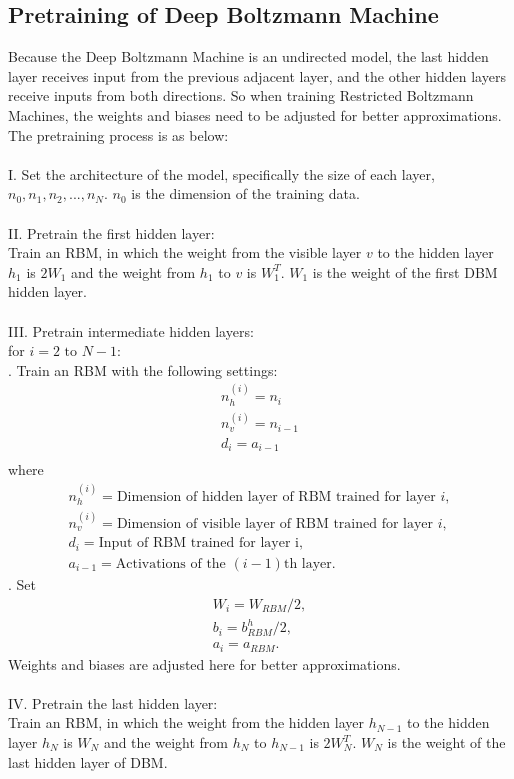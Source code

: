 \documentclass[12pt]{article}
\begin{document}
\subsection{Pretraining of Deep Boltzmann Machine}
Because the Deep Boltzmann Machine is an undirected model, the last hidden layer receives input from the previous adjacent layer, and the other hidden layers receive inputs from both directions. So when training Restricted Boltzmann Machines, the weights and biases need to be adjusted for better approximations. The pretraining process is as below:\\
\\
I. Set the architecture of the model, specifically the size of each layer, \(n_0, n_1, n_2, ..., n_N\). $n_0$ is the dimension of the training data.\\
\\
II. Pretrain the first hidden layer:\\
Train an RBM, in which the weight from the visible layer $v$ to the hidden layer $h_1$ is $2W_1$ and the weight from $h_1$ to $v$ is $W_1^{T}$. $W_1$ is the weight of the first DBM hidden layer.\\
\\
III. Pretrain intermediate hidden layers:\\
for $i = 2\text{ to }N - 1$:\\
. Train an RBM with the following settings:\\
\begin{gather*}
n_h^{(i)}=n_i\\
n_v^{(i)}=n_{i-1}\\
d_i=a_{i-1}\\
\end{gather*}
\indent where
\begin{gather*}
n_h^{(i)} = \text{Dimension of hidden layer of RBM trained for layer }i,\\
n_v^{(i)} = \text{Dimension of visible layer of RBM trained for layer }i,\\
d_i = \text{Input of RBM trained for layer i},\\
a_{i-1} = \text{Activations of the }(i-1)\text{th layer}.
\end{gather*}
. Set \begin{gather*}
W_i = W_{RBM} / 2,\\
b_i = b^h_{RBM} / 2,\\
a_i = a_{RBM}.
\end{gather*}
\indent Weights and biases are adjusted here for better approximations.\\
\\
IV. Pretrain the last hidden layer:\\
Train an RBM, in which the weight from the hidden layer $h_{N-1}$ to the hidden layer $h_N$ is $W_N$ and the weight from $h_{N}$ to $h_{N-1}$ is $2W_N^{T}$. $W_N$ is the weight of the last hidden layer of DBM.
\end{document}
